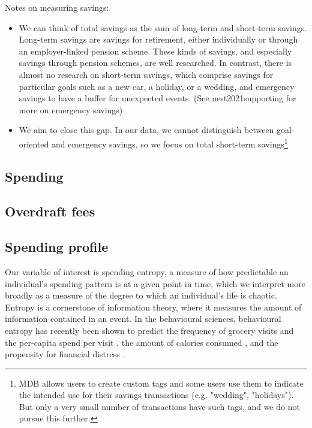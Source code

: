Notes on measuring savings:
\begin{itemize}

    \item We can think of total savings as the sum of long-term and short-term
        savings. Long-term savings are savings for retirement, either
        individually or through an employer-linked pension scheme. These kinds
        of savings, and especially savings through pension schemes, are well
        researched. In contrast, there is almost no research on short-term
        savings, which comprise savings for particular goals such as a new car,
        a holiday, or a wedding, and emergency savings to have a buffer for
        unexpected events. (See nest2021supporting for more on emergency
        savings)

    \item We aim to close this gap. In our data, we cannot distinguish between
        goal-oriented and emergency savings, so we focus on total short-term
        savings\footnote{MDB allows users to create custom tags and some users
            use them to indicate the intended use for their savings
            transactions (e.g. "wedding", "holidays"). But only a very small
        number of transactions have such tags, and we do not pursue this
    further.}


\end{itemize}



\subsection{Spending}
\label{par:spending}



\subsection{Overdraft fees}
\label{par:overdraft_fees}







\subsection{Spending profile}%
\label{par:variable_of_interest_}
Our variable of interest is spending entropy, a measure of how predictable an
individual's spending pattern is at a given point in time, which we interpret
more broadly as a measure of the degree to which an individual's life is
chaotic. Entropy is a cornerstone of information theory, where it measures the
amount of information contained in an event. In the behavioural sciences,
behavioural entropy has recently been shown to predict the frequency of grocery
visits and the per-capita spend per visit \citep{guidotti2015behavioral}, the
amount of calories consumed \citep{skatova2019those}, and the propensity for
financial distress \citep{muggleton2020evidence}.

